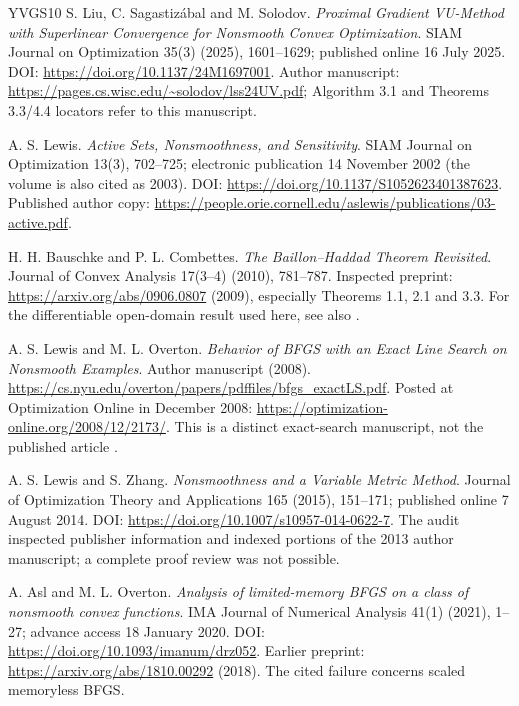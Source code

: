 \begin{thebibliography}{YVGS10}
 S. Liu, C. Sagastiz\'abal and M. Solodov. \emph{Proximal Gradient VU-Method with Superlinear Convergence for Nonsmooth Convex Optimization}. SIAM Journal on Optimization 35(3) (2025), 1601--1629; published online 16 July 2025. DOI: \url{https://doi.org/10.1137/24M1697001}. Author manuscript: \url{https://pages.cs.wisc.edu/~solodov/lss24UV.pdf}; Algorithm 3.1 and Theorems 3.3/4.4 locators refer to this manuscript.

 A. S. Lewis. \emph{Active Sets, Nonsmoothness, and Sensitivity}. SIAM Journal on Optimization 13(3), 702--725; electronic publication 14 November 2002 (the volume is also cited as 2003). DOI: \url{https://doi.org/10.1137/S1052623401387623}. Published author copy: \url{https://people.orie.cornell.edu/aslewis/publications/03-active.pdf}.

 H. H. Bauschke and P. L. Combettes. \emph{The Baillon--Haddad Theorem Revisited}. Journal of Convex Analysis 17(3--4) (2010), 781--787. Inspected preprint: \url{https://arxiv.org/abs/0906.0807} (2009), especially Theorems 1.1, 2.1 and 3.3. For the differentiable open-domain result used here, see also \cite{WW}.

 A. S. Lewis and M. L. Overton. \emph{Behavior of BFGS with an Exact Line Search on Nonsmooth Examples}. Author manuscript (2008). \url{https://cs.nyu.edu/overton/papers/pdffiles/bfgs_exactLS.pdf}. Posted at Optimization Online in December 2008: \url{https://optimization-online.org/2008/12/2173/}. This is a distinct exact-search manuscript, not the published article \cite{LO}.

 A. S. Lewis and S. Zhang. \emph{Nonsmoothness and a Variable Metric Method}. Journal of Optimization Theory and Applications 165 (2015), 151--171; published online 7 August 2014. DOI: \url{https://doi.org/10.1007/s10957-014-0622-7}. The audit inspected publisher information and indexed portions of the 2013 author manuscript; a complete proof review was not possible.

 A. Asl and M. L. Overton. \emph{Analysis of limited-memory BFGS on a class of nonsmooth convex functions}. IMA Journal of Numerical Analysis 41(1) (2021), 1--27; advance access 18 January 2020. DOI: \url{https://doi.org/10.1093/imanum/drz052}. Earlier preprint: \url{https://arxiv.org/abs/1810.00292} (2018). The cited failure concerns scaled memoryless BFGS.


\end{thebibliography}
